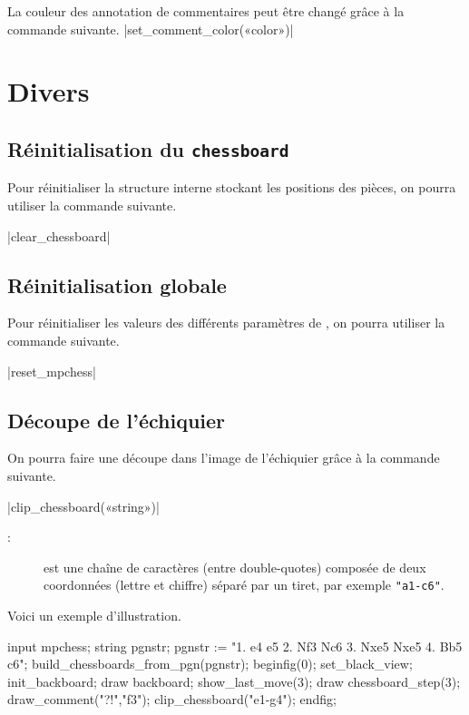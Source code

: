 \documentclass[french]{ltxdoc}
\begin{document}
La couleur des annotation de commentaires peut être changé grâce à la commande
suivante.
\commande|set_comment_color(«color»)|\smallskip



\section{Divers}

\subsection{Réinitialisation du \lstinline+chessboard+}

Pour réinitialiser la structure interne stockant les positions des pièces, on
pourra utiliser la commande suivante.

\commande|clear_chessboard|\smallskip


\subsection{Réinitialisation globale}

Pour réinitialiser les valeurs des différents paramètres de \mpchess, on pourra
utiliser la commande suivante.

\commande|reset_mpchess|\smallskip


\subsection{Découpe de l’échiquier}

On pourra faire une découpe dans l’image de l’échiquier grâce à la commande suivante.

\commande|clip_chessboard(«string»)|\smallskip


\begin{description}
\item[:] est une chaîne de caractères (entre double-quotes)
composée de deux coordonnées (lettre et chiffre) séparé par un tiret, par
exemple \lstinline+"a1-c6"+.
\end{description}

Voici un exemple d’illustration.
\begin{ExempleMP}
input mpchess;
string pgnstr;
pgnstr := "1. e4 e5 2. Nf3 Nc6 3. Nxe5 Nxe5 4. Bb5 c6";
build_chessboards_from_pgn(pgnstr);
beginfig(0);
set_black_view;
init_backboard;
draw backboard;
show_last_move(3);
draw chessboard_step(3); %
draw_comment("?!","f3");
clip_chessboard("e1-g4");
endfig;
\end{ExempleMP}
\end{document}
